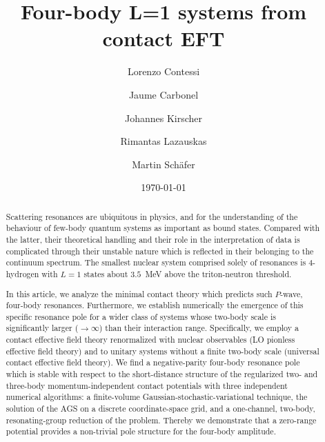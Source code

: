 \documentclass[aps,onecolumn,preprintnumbers,amsmath,amssymb,nofootinbib,superscriptaddress,notitlepage]{revtex4-1}
\begin{document}
\title{Four-body L=1 systems from contact EFT}

\author{Lorenzo Contessi}
\address{IRFU, CEA, Universit\'e Paris-Saclay, 91191 Gif-sur-Yvette, France}

\author{Jaume Carbonel}
\address{Universit\'e Paris-Saclay, CNRS/IN2P3, IJCLab, 91405 Orsay, France}

\author{Johannes Kirscher}
\address{Theoretical Physics Division, School of Physics and Astronomy,\\
  The University of Manchester, Manchester, M13 9PL, UK}
  
\author{Rimantas Lazauskas}
\address{IPHC, IN2P3-CNRS/Universit\'e de Strasbourg BP 28, F-67037 Strasbourg Cedex 2, France}

\author{Martin Sch{\"a}fer}
\address{Nuclear Physics Institute of the Czech Academy of Sciences, 25069 \v{R}e\v{z}, Czech Republic}

\date{\today}


\begin{abstract} 
Scattering resonances are ubiquitous in physics, and for the understanding of the behaviour of few-body quantum systems as important as bound states.
Compared with the latter, their theoretical handling and their role in the interpretation of data is complicated through their unstable nature which is reflected in their belonging to the continuum spectrum.
The smallest nuclear system comprised solely of resonances is 4-hydrogen with $L=1$ states about $3.5$~MeV above the triton-neutron
threshold.

In this article, we analyze the minimal contact theory which predicts
such $P$-wave, four-body resonances. Furthermore, we establish numerically
the emergence of this specific resonance pole for a wider class of systems
whose two-body scale is significantly larger ($\to\infty$) than their interaction range.
Specifically, we employ a contact effective field theory renormalized
with nuclear observables (LO pionless effective field theory)
and to unitary systems without a finite two-body scale (universal
contact effective field theory). We find a negative-parity four-body
resonance pole which is stable with respect to the short-distance structure
of the regularized two- and three-body momentum-independent contact
potentials with three independent numerical algorithms: a finite-volume
Gaussian-stochastic-variational technique, the solution of the AGS on a
discrete coordinate-space grid, and a one-channel, two-body,
resonating-group reduction of the problem.
Thereby we demonstrate that a zero-range potential
provides a non-trivial pole structure for the four-body amplitude.
\end{abstract}
\end{document}
